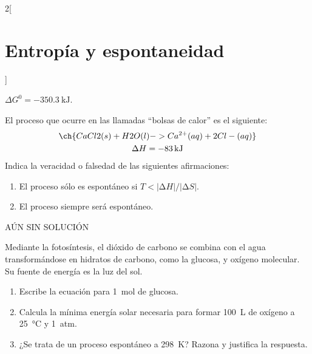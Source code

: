 \documentclass[10pt]{article}
\begin{document}
\begin{multicols}{2}[
  \section{Entropía y espontaneidad}
  ]
  \begin{solution}
    \( \Delta G^0 = \SI{-350.3}{\kilo\joule} \).
  \end{solution}




  \begin{exercise}[
      tags    = {termodinámica, espontaneidad, Gibbs},
      topics  = {química, termoquímica, termodinámica},
      source  = {},
    ]
    El proceso que ocurre en las llamadas “bolsas de calor” es el siguiente:
    \begin{multline*}
      \ch{CaCl2(s) + H2O(l) -> Ca^{2+}(aq) + 2 Cl-(aq)} \\
      \Delta H = \SI{-83}{\kilo\joule}
    \end{multline*}
    Indica la veracidad o falsedad de las siguientes afirmaciones:
    \begin{enumerate}
      \item El proceso sólo es espontáneo si \( T < |∆H|/|∆S| \).
      \item El proceso siempre será espontáneo.
    \end{enumerate}

  \end{exercise}

  \begin{solution}
    AÚN SIN SOLUCIÓN %
  \end{solution}




  \begin{exercise}[
      tags    = {termodinámica, espontaneidad, Gibbs},
      topics  = {química, termoquímica, termodinámica},
      source  = {Química 1B VV 2015, p133, e40},
    ]
    Mediante la fotosíntesis, el dióxido de carbono se combina con el agua transformándose en hidratos de carbono, como la glucosa, y oxígeno molecular. Su fuente de energía es la luz del sol.
    \begin{enumerate}
      \item Escribe la ecuación para \SI{1}{\mole} de glucosa.
      \item Calcula la mínima energía solar necesaria para formar \SI{100}{\liter} de oxígeno a \SI{25}{\celsius} y \SI{1}{atm}.
      \item ¿Se trata de un proceso espontáneo a \SI{298}{\kelvin}? Razona y justifica la respuesta.
    \end{enumerate}


\end{exercise}
\end{multicols}
\end{document}
